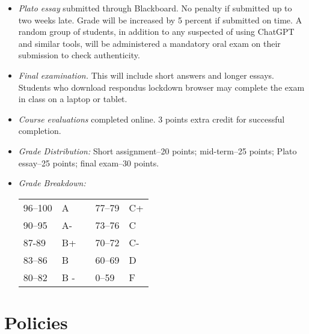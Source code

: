 \documentclass[article,oneside]{memoir}
\begin{document}
\begin{itemize}
\item \textit{Plato essay} submitted through Blackboard. No penalty if submitted up to two weeks late. Grade will be increased by 5 percent if submitted on time. A random group of students, in addition to any suspected of using ChatGPT and similar tools, will be administered a mandatory oral exam on their submission to check authenticity. 

\item \textit{Final examination.} This will include short answers and longer essays. Students who download respondus lockdown browser may complete the exam in class on a laptop or tablet. 


\item \textit{Course evaluations} completed online. 3 points extra credit for successful completion.

\item \textit{Grade Distribution:} Short assignment--20 points; mid-term--25 points; Plato essay--25 points; final exam--30 points.



\item \textit{Grade Breakdown:}

 \begin{tabular}{ | l | l | p{2cm} | l | l | }
    \hline 
96--100 & A  & &  77--79 &  C+ \\  
90--95 & A- & &  73--76 & C \\
87-89 & B+ &  &  70--72 & C- \\ 
83--86 & B  & &  60--69 & D\\
80--82 & B - & & 0--59 & F\\ \hline
    \end{tabular}


\end{itemize}





\section{Policies}
\end{document}
